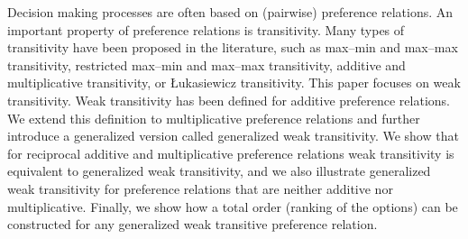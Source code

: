 
Decision making processes are often based on 
(pairwise) preference relations.
An important property of preference relations
is transitivity.
Many types of transitivity have been proposed in the
literature, such as
max--min and max--max transitivity,
restricted max--min and max--max transitivity,
additive and multiplicative transitivity, or
{\L}ukasiewicz transitivity.
This paper focuses on weak transitivity.
Weak transitivity has been defined 
for additive preference relations.
We extend this definition to multiplicative preference 
relations and further introduce a generalized version called
generalized weak transitivity.
We show that
for reciprocal additive and multiplicative preference relations
weak transitivity is equivalent to
generalized weak transitivity,
and we also illustrate 
generalized weak transitivity
for preference relations that are neither additive nor multiplicative.
Finally,
we show how
a total order (ranking of the options) can
be constructed for any
generalized weak transitive preference relation.

